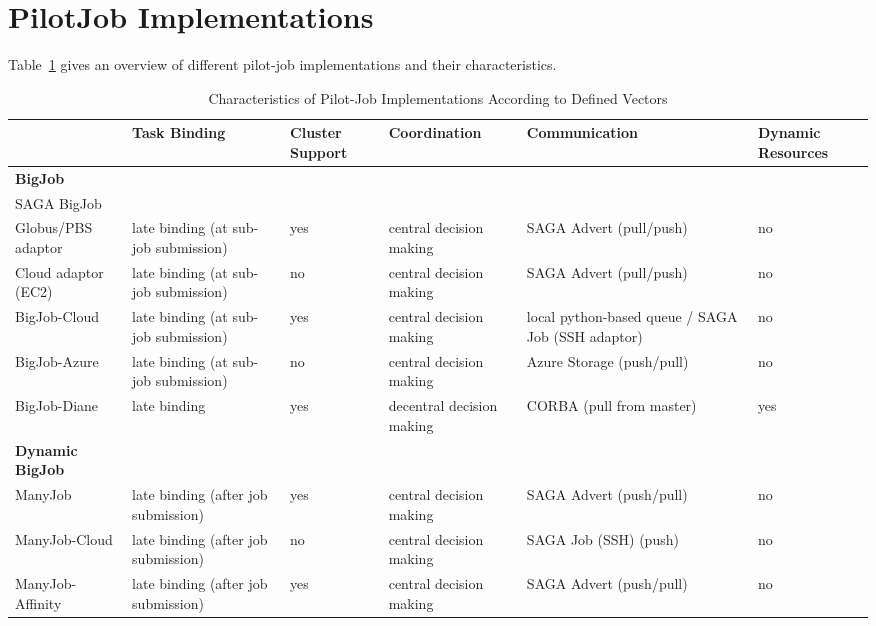 \documentclass[]{article}
\begin{document}
\section{PilotJob Implementations}

Table~\ref{tab:pilotjob_overview} gives an overview of different pilot-job
implementations and their characteristics.

\begin{table}[t]
\begin{tabular}{|l|p{2.5cm}|p{2cm}|p{2cm}|p{2cm}|p{2cm}|}
	\hline
	&\textbf{Task Binding} &\textbf{Cluster Support} &\textbf{Coordina\-tion} & \textbf{Communica\-tion} &\textbf{Dynamic Resources}\\
	\hline
	\textbf{BigJob} & &&&&\\
	\hline
	SAGA BigJob & &&&&\\
	\hline
	\hspace{4mm} Globus/PBS adaptor  &late binding (at sub-job submission)  
									 &yes &central decision making &SAGA Advert (pull/push) &no\\  
	\hline
	\hspace{4mm} Cloud adaptor (EC2) &late binding (at sub-job submission)  
									 &no &central decision making &SAGA Advert (pull/push) &no\\ 
	\hline
 	BigJob-Cloud &late binding (at sub-job submission) &yes &central decision making 
				 &local python-based queue / SAGA Job (SSH adaptor) &no\\ 
	\hline
	BigJob-Azure &late binding (at sub-job submission)
	             &no &central decision making &Azure Storage (push/pull) &no\\ 
	\hline
    BigJob-Diane &late binding  &yes &decentral decision making &CORBA (pull from master) &yes\\ 
	\hline	
	\textbf{Dynamic BigJob} & &&&&\\
	\hline
    ManyJob &late binding (after job submission) &yes &central decision making &SAGA Advert (push/pull) &no\\
	\hline
 	ManyJob-Cloud &late binding (after job submission) &no &central decision making &SAGA Job (SSH) (push) &no\\
	\hline 
	ManyJob-Affinity &late binding (after job submission)
	&yes &central decision making &SAGA Advert (push/pull) &no\\
	\hline
\end{tabular}
\caption{Characteristics of Pilot-Job Implementations According 
		to Defined Vectors} \label{tab:pilotjob_overview}
\end{table}		
\end{document}
